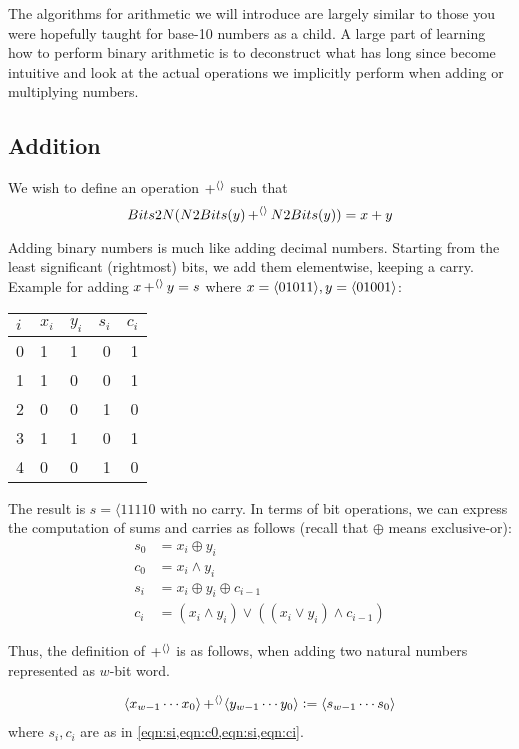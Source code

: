 The algorithms for arithmetic we will introduce are largely similar to
those you were hopefully taught for base-10 numbers as a child.  A
large part of learning how to perform binary arithmetic is to
deconstruct what has long since become intuitive and look at the
actual operations we implicitly perform when adding or multiplying
numbers.

\subsection{Addition}
\label{sec:bit-addition}

We wish to define an operation $\operatorname{+^{\langle\rangle}}$ such that
\begin{equation}
  Bits2N(N2Bits(y)\operatorname{+^{\langle\rangle}}{}N2Bits(y)) = x + y
\end{equation}

Adding binary numbers is much like adding decimal numbers.  Starting
from the least significant (rightmost) bits, we add them elementwise,
keeping a carry.  Example for adding $x\operatorname{+^{\langle\rangle}}{} y=s$ where
$x=\langle 01011 \rangle, y=\langle 01001 \rangle$:

\begin{center}
\begin{tabular}{l|llrr}
  $i$ & $x_{i}$ & $y_{i}$ & $s_{i}$ & $c_{i}$ \\\hline
  0 & 1 & 1 & 0 & 1 \\
  1 & 1 & 0 & 0 & 1 \\
  2 & 0 & 0 & 1 & 0 \\
  3 & 1 & 1 & 0 & 1 \\
  4 & 0 & 0 & 1 & 0
\end{tabular}
\end{center}

The result is $s=\langle{11110}$ with no carry.  In terms of bit
operations, we can express the computation of sums and carries as
follows (recall that $\oplus$ means exclusive-or):
\begin{align}
  s_{0} &= x_{i} \oplus y_{i} \label{eqn:s0} \\
  c_{0} &= x_{i} \land y_{i} \label{eqn:c0} \\
  s_{i} &= x_{i} \oplus y_{i} \oplus c_{i-1} \label{eqn:si} \\
  c_{i} &= (x_{i} \land y_{i})\lor ((x_{i}\lor y_{i})\land c_{i-1}) \label{eqn:ci}
\end{align}

Thus, the definition of $\operatorname{+^{\langle\rangle}}$ is as follows, when adding two
natural numbers represented as $w$-bit word.
\begin{definition}
\begin{align*}
  \langle x_{w-1}\cdots{}x_{0} \rangle \operatorname{+^{\langle\rangle}} \langle y_{w-1}\cdots{}y_{0} \rangle \vcentcolon=
  \langle s_{w-1}\cdots{}s_{0} \rangle
\end{align*}
where $s_{i},c_{i}$ are as in \cref{eqn:si,eqn:c0,eqn:si,eqn:ci}.
\label{def:intadd}
\end{definition}

